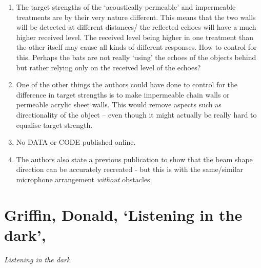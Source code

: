 \documentclass[
]{book}
\providecommand{\tightlist}{%
  \setlength{\itemsep}{0pt}\setlength{\parskip}{0pt}}
\begin{document}
\begin{enumerate}
\def\labelenumi{\arabic{enumi}.}
\tightlist
\item
  The target strengths of the `acoustically permeable' and impermeable treatments are by their very nature different. This means that the two walls will be detected at different distances/ the reflected echoes will have a much higher received level. The received level being higher in one treatment than the other itself may cause all kinds of different responses. How to control for this. Perhaps the bats are not really `using' the echoes of the objects behind but rather relying only on the received level of the echoes?
\item
  One of the other things the authors could have done to control for the difference in target strengths is to make impermeable chain walls or permeable acrylic sheet walls. This would remove aspects such as directionality of the object -- even though it might actually be really hard to equalise target strength.
\item
  No DATA or CODE published online.
\item
  The authors also state a previous publication to show that the beam shape direction can be accurately recreated - but this is with the same/similar microphone arrangement \emph{without} obstacles
\end{enumerate}

\hypertarget{griffin-donald-listening-in-the-dark}{%
\chapter{Griffin, Donald, `Listening in the dark',}\label{griffin-donald-listening-in-the-dark}}


\emph{Listening in the dark} \citep{griffin1958listening}
\end{document}
